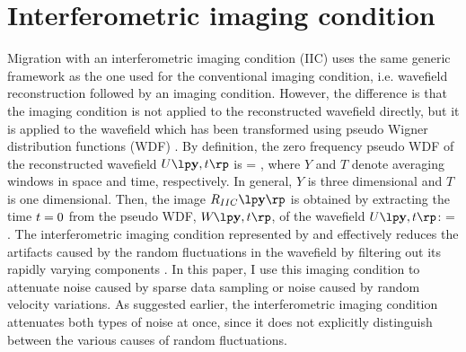 \section{Interferometric imaging condition}

Migration with an interferometric imaging condition (IIC) uses the
same generic framework as the one used for the conventional imaging
condition, i.e. wavefield reconstruction followed by an imaging
condition.  However, the difference is that the imaging condition is
not applied to the reconstructed wavefield directly, but it is applied
to the wavefield which has been transformed using pseudo Wigner
distribution functions (WDF) \cite[]{Wigner.wdf}. By definition, the
zero frequency pseudo WDF of the reconstructed wavefield
$\UU{\ym,\tm}$ is
%
\beq \label{eqn:wdf}
\WA{}{\ym,\tm} = \intth \intyh
{}
 \;,
\eeq
%
where $Y$ and $T$ denote averaging windows in space and time,
respectively. In general, $Y$ is three dimensional and $T$ is one
dimensional. Then, the image $\IA{IIC}{\ym}$ is obtained by extracting
the time ${t}=0$ from the pseudo WDF, $\WA{}{\ym,\tm}$, of the
wavefield $\UU{\ym,\tm}$:
%
\beq \label{eqn:iic}
 =  \;.
\eeq
%
The interferometric imaging condition represented by  and
 effectively reduces the artifacts caused by the random
fluctuations in the wavefield by filtering out its rapidly varying
components \cite[]{SavaPoliannikov.geo.iic}. In this paper, I use this
imaging condition to attenuate noise caused by sparse data sampling or
noise caused by random velocity variations. As suggested earlier, the
interferometric imaging condition attenuates both types of noise at
once, since it does not explicitly distinguish between the various
causes of random fluctuations.


